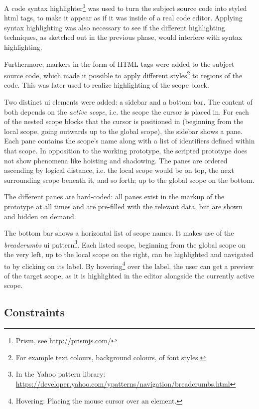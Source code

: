 A code syntax highlighter\footnote{Prism, see \url{http://prismjs.com/}}
was used to turn the subject source code into styled \ac{html} tags, to
make it appear as if it was inside of a real code editor. Applying
syntax highlighting was also necessary to see if the different
highlighting techniques, as sketched out in the previous phase, would
interfere with syntax highlighting.

Furthermore, markers in the form of HTML tags were added to the subject
source code, which made it possible to apply different
styles\footnote{For example text colours, background colours, of font styles.}
to regions of the code. This was later used to realize highlighting of
the scope block.

Two distinct \ac{ui} elements were added: a sidebar and a bottom bar.
The content of both depends on the \emph{active scope}, i.e. the scope
the cursor is placed in. For each of the nested scope blocks that the
cursor is positioned in (beginning from the local scope, going outwards
up to the global scope), the sidebar shows a pane. Each pane contains
the scope’s name along with a list of identifiers defined within that
scope. In opposition to the working prototype, the scripted prototype
does not show phenomena like hoisting and shadowing. The panes are
ordered ascending by logical distance, i.e. the local scope would be on
top, the next surrounding scope beneath it, and so forth; up to the
global scope on the bottom.

The different panes are hard-coded: all panes exist in the markup of the
prototype at all times and are pre-filled with the relevant data, but
are shown and hidden on demand.

The bottom bar shows a horizontal list of scope names. It makes use of
the \emph{breadcrumbs} \ac{ui}
pattern\footnote{In the Yahoo pattern library: \url{https://developer.yahoo.com/ypatterns/navigation/breadcrumbs.html}}.
Each listed scope, beginning from the global scope on the very left, up
to the local scope on the right, can be highlighted and navigated to by
clicking on its label. By
hovering\footnote{Hovering: Placing the mouse cursor over an element.}
over the label, the user can get a preview of the target scope, as it is
highlighted in the editor alongside the currently active scope.

\subsection{Constraints}\label{constraints}

